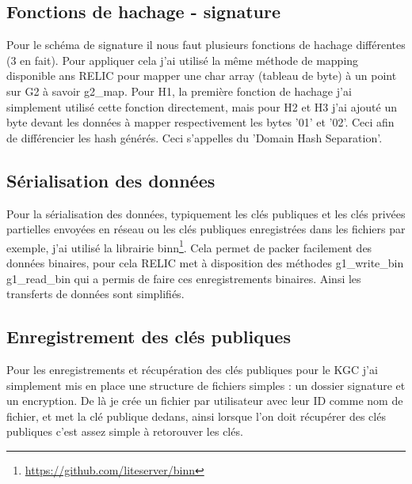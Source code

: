 \subsection{Fonctions de hachage - signature}
Pour le schéma de signature il nous faut plusieurs fonctions de hachage différentes (3 en fait). Pour appliquer cela j'ai utilisé la même méthode de mapping disponible ans RELIC pour mapper une char array (tableau de byte) à un point sur G2 à savoir g2\_map.
Pour H1, la première fonction de hachage j'ai simplement utilisé cette fonction directement, mais pour H2 et H3 j'ai ajouté un byte devant les données à mapper respectivement les bytes '01' et '02'. Ceci afin de différencier les hash générés. Ceci s'appelles du 'Domain Hash Separation'.
\subsection{Sérialisation des données}
Pour la sérialisation des données, typiquement les clés publiques et les clés privées partielles envoyées en réseau ou les clés publiques enregistrées dans les fichiers par exemple, j'ai utilisé la librairie binn\footnote{\url{https://github.com/liteserver/binn}}. Cela permet de packer facilement des données binaires, pour cela RELIC met à disposition des méthodes g1\_write\_bin g1\_read\_bin qui a permis de faire ces enregistrements binaires. Ainsi les transferts de données sont simplifiés.
\subsection{Enregistrement des clés publiques}
Pour les enregistrements et récupération des clés publiques pour le KGC j'ai simplement mis en place une structure de fichiers simples : un dossier signature et un encryption. De là je crée un fichier par utilisateur avec leur ID comme nom de fichier, et met la clé publique dedans, ainsi lorsque l'on doit récupérer des clés publiques c'est assez simple à retorouver les clés. 
